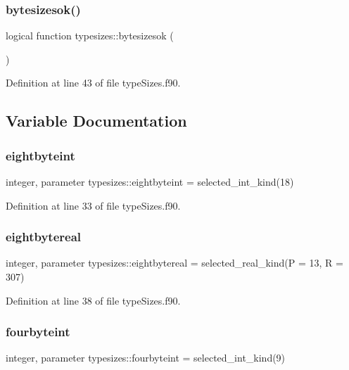 \subsubsection{\texorpdfstring{bytesizesok()}{bytesizesok()}}
{\footnotesize\ttfamily logical function typesizes\+::bytesizesok (\begin{DoxyParamCaption}{ }\end{DoxyParamCaption})}



Definition at line 43 of file type\+Sizes.\+f90.



\subsection{Variable Documentation}
\mbox{\label{namespacetypesizes_a10dcbb5b8bcff788b35e312be2b1f49a}} 
\subsubsection{\texorpdfstring{eightbyteint}{eightbyteint}}
{\footnotesize\ttfamily integer, parameter typesizes\+::eightbyteint = selected\+\_\+int\+\_\+kind(18)}



Definition at line 33 of file type\+Sizes.\+f90.

\mbox{\label{namespacetypesizes_a7e57bc93c84af9c608fcea1661caa070}} 
\subsubsection{\texorpdfstring{eightbytereal}{eightbytereal}}
{\footnotesize\ttfamily integer, parameter typesizes\+::eightbytereal = selected\+\_\+real\+\_\+kind(P = 13, R = 307)}



Definition at line 38 of file type\+Sizes.\+f90.

\mbox{\label{namespacetypesizes_ac1638da869cdc25b2ab9a90bea92ff44}} 
\subsubsection{\texorpdfstring{fourbyteint}{fourbyteint}}
{\footnotesize\ttfamily integer, parameter typesizes\+::fourbyteint = selected\+\_\+int\+\_\+kind(9)}



